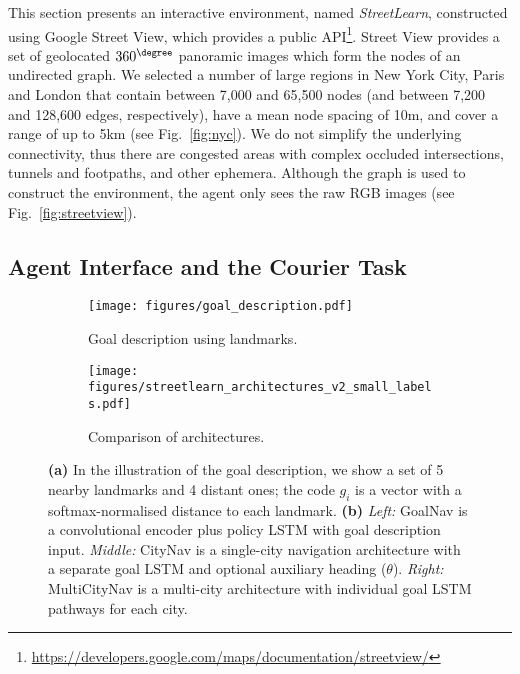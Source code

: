 
This section presents an interactive environment, named \emph{StreetLearn}, constructed using Google Street View, which provides a public API\footnote{\url{https://developers.google.com/maps/documentation/streetview/}}. 
Street View provides a set of geolocated $360^{\degree}$ panoramic images which form the nodes of an undirected graph. We selected a number of large regions in New York City, Paris and London that contain between 7,000 and 65,500 nodes (and between 7,200 and 128,600 edges, respectively), have a mean node spacing of 10m, and cover a range of up to 5km (see Fig.~\ref{fig:nyc}).
We do not simplify the underlying connectivity, thus there are congested areas with complex occluded intersections, tunnels and footpaths, and other ephemera. Although the graph is used to construct the environment, the agent only sees the raw RGB images (see Fig.~\ref{fig:streetview}).


\subsection{Agent Interface and the Courier Task}
\label{sec:agent}


\begin{figure}[t]
\begin{center}
\begin{subfigure}{.45\textwidth}
  \centering
  \texttt{[image: figures/goal\_description.pdf]}
  \caption{Goal description using landmarks.}
  \label{fig:goals}
\end{subfigure}%
\begin{subfigure}{.55\textwidth}
  \centering
  \texttt{[image: figures/streetlearn\_architectures\_v2\_small\_labels.pdf]}
  \caption{Comparison of architectures.}
  \label{fig:architecture}
\end{subfigure}
\caption{
\textbf{(a)} In the illustration of the goal description, we show a set of 5 nearby landmarks and 4 distant ones; the code $g_i$ is a vector with a softmax-normalised distance to each landmark.
\textbf{(b)} \emph{Left:} GoalNav is a convolutional encoder plus policy LSTM  with goal description input. \emph{Middle:} CityNav is a single-city navigation architecture with a separate goal LSTM and optional auxiliary heading ($\theta$). \emph{Right:} MultiCityNav is a multi-city architecture with individual goal LSTM pathways for each city.
}
\label{fig:goals_architecture}
\end{center}
\vskip -0.25in
\end{figure}

